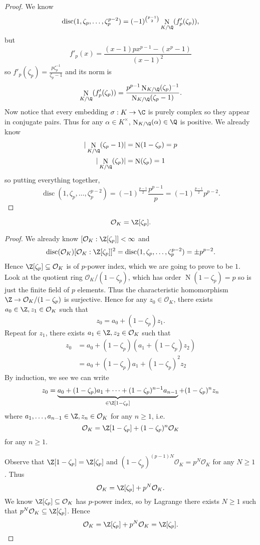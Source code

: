 \documentclass[a4paper]{article}
\renewcommand*{\O}{\mathcal{O}}
\DeclareMathOperator{\n}{N}
\DeclareMathOperator{\disc}{disc}
\begin{document}
\begin{proof}
  We know 
  \[
    \disc(1, \zeta_p, \dots, \zeta_p^{p - 2}) = (-1)^{\binom{p - 1}{2}} \n_{K/\Q} (f'_p(\zeta_p)),
  \]
  but
  \[
    f'_p(x) = \frac{(x - 1) p x^{p - 1} - (x^p - 1)}{(x - 1)^2}
  \]
  so \(f'_p(\zeta_p) = \frac{p\zeta_p^{-1}}{\zeta_p - 1}\) and its norm is
  \[
    \n_{K/\Q}(f'_p(\zeta_p)) = \frac{p^{p - 1} \n_{K/\Q}(\zeta_p)^{-1}}{\n_{K/\Q}(\zeta_p - 1)}.
  \]
  Now notice that every embedding \(\sigma: K \to \C\) is purely complex so they appear in conjugate pairs. Thus for any \(\alpha \in K^\times\), \(\n_{K/\Q}(\alpha) \in \Q\) is positive. We already know
  \begin{align*}
    |\n_{K/\Q}(\zeta_p - 1)| &= \n(1 - \zeta_p) = p \\
    |\n_{K/\Q}(\zeta_p)| &= \n(\zeta_p) = 1
  \end{align*}
  so putting everything together,
  \[
    \disc(1, \zeta_p, \dots, \zeta_p^{p - 2}) = (-1)^{\frac{p - 1}{2}} \frac{p^{p - 1}}{p} = (-1)^{\frac{p - 1}{2}} p^{p - 2}.
  \]
\end{proof}

\begin{proposition}
  \[
    \O_K = \Z[\zeta_p].
  \]
\end{proposition}

\begin{proof}
  We already know \([\O_K: \Z[\zeta_p]] < \infty\) and
  \[
    \disc(\O_K) [\O_K: \Z[\zeta_p]]^2 = \disc(1, \zeta_p, \dots, \zeta_p^{p - 2}) = \pm p^{p - 2}.
  \]
  Hence \(\Z[\zeta_p] \subseteq \O_K\) is of \(p\)-power index, which we are going to prove to be \(1\). Look at the quotient ring \(\O_K/(1 - \zeta_p)\), which has order \(\n(1 - \zeta_p) = p\) so is just the finite field of \(p\) elements. Thus the characteristic homomorphism \(\Z \to \O_K/(1 - \zeta_p)\) is surjective. Hence for any \(z_0 \in \O_K\), there exists \(a_0 \in \Z, z_1 \in \O_K\) such that
  \[
    z_0 = a_0 + (1 - \zeta_p)z_1.
  \]
  Repeat for \(z_1\), there exists \(a_1 \in \Z, z_2 \in \O_K\) such that
  \begin{align*}
    z_0 &= a_0 + (1 - \zeta_p)(a_1 + (1 - \zeta_p)z_2) \\
        &= a_0 + (1 - \zeta_p)a_1 + (1 - \zeta_p)^2z_2
  \end{align*}
  By induction, we see we can write
  \[
    z_0 = \underbrace{a_0 + (1 - \zeta_p)a_1 + \dots + (1 - \zeta_p)^{n - 1}a_{n - 1}}_{\in \Z[1 - \zeta_p]} + (1 - \zeta_p)^n z_n
  \]
  where \(a_1, \dots, a_{n - 1} \in \Z, z_n \in \O_K\) for any \(n \geq 1\), i.e.
  \[
    \O_K = \Z[1 - \zeta_p] + (1 - \zeta_p)^n \O_K
  \]
  for any \(n \geq 1\).

  Observe that \(\Z[1 - \zeta_p] = \Z[\zeta_p]\) and \((1 - \zeta_p)^{(p - 1)N} \O_K = p^N \O_K\) for any \(N \geq 1\). Thus
  \[
    \O_K = \Z[\zeta_p] + p^N\O_K.
  \]
  We know \(\Z[\zeta_p] \subseteq \O_K\) has \(p\)-power index, so by Lagrange there exists \(N \geq 1\) such that \(p^N \O_K \subseteq \Z[\zeta_p]\). Hence
  \[
    \O_K = \Z[\zeta_p] + p^N\O_K = \Z[\zeta_p].
  \]
\end{proof}
\end{document}
